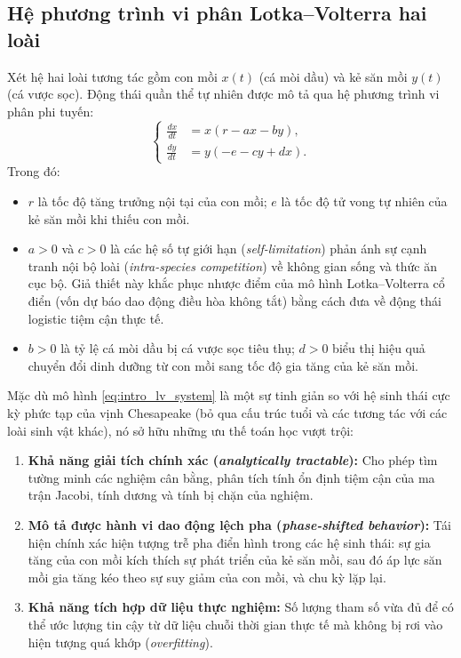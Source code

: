 \subsection{Hệ phương trình vi phân Lotka--Volterra hai loài}
Xét hệ hai loài tương tác gồm con mồi $x(t)$ (cá mòi dầu) và kẻ săn mồi $y(t)$ (cá vược sọc). Động thái quần thể tự nhiên được mô tả qua hệ phương trình vi phân phi tuyến:
\begin{equation}
\label{eq:intro_lv_system}
\left\{
\begin{aligned}
\frac{dx}{dt} &= x(r - ax - by), \\
\frac{dy}{dt} &= y(-e - cy + dx).
\end{aligned}
\right.
\end{equation}
Trong đó:
\begin{itemize}
    \item $r$ là tốc độ tăng trưởng nội tại của con mồi; $e$ là tốc độ tử vong tự nhiên của kẻ săn mồi khi thiếu con mồi.
    \item $a > 0$ và $c > 0$ là các hệ số tự giới hạn (\textit{self-limitation}) phản ánh sự cạnh tranh nội bộ loài (\textit{intra-species competition}) về không gian sống và thức ăn cục bộ. Giả thiết này khắc phục nhược điểm của mô hình Lotka--Volterra cổ điển (vốn dự báo dao động điều hòa không tắt) bằng cách đưa về động thái logistic tiệm cận thực tế.
    \item $b > 0$ là tỷ lệ cá mòi dầu bị cá vược sọc tiêu thụ; $d > 0$ biểu thị hiệu quả chuyển đổi dinh dưỡng từ con mồi sang tốc độ gia tăng của kẻ săn mồi.
\end{itemize}

Mặc dù mô hình \eqref{eq:intro_lv_system} là một sự tinh giản so với hệ sinh thái cực kỳ phức tạp của vịnh Chesapeake (bỏ qua cấu trúc tuổi và các tương tác với các loài sinh vật khác), nó sở hữu những ưu thế toán học vượt trội:
\begin{enumerate}
    \item \textbf{Khả năng giải tích chính xác (\textit{analytically tractable}):} Cho phép tìm tường minh các nghiệm cân bằng, phân tích tính ổn định tiệm cận của ma trận Jacobi, tính dương và tính bị chặn của nghiệm.
    \item \textbf{Mô tả được hành vi dao động lệch pha (\textit{phase-shifted behavior}):} Tái hiện chính xác hiện tượng trễ pha điển hình trong các hệ sinh thái: sự gia tăng của con mồi kích thích sự phát triển của kẻ săn mồi, sau đó áp lực săn mồi gia tăng kéo theo sự suy giảm của con mồi, và chu kỳ lặp lại.
    \item \textbf{Khả năng tích hợp dữ liệu thực nghiệm:} Số lượng tham số vừa đủ để có thể ước lượng tin cậy từ dữ liệu chuỗi thời gian thực tế mà không bị rơi vào hiện tượng quá khớp (\textit{overfitting}).
\end{enumerate}

